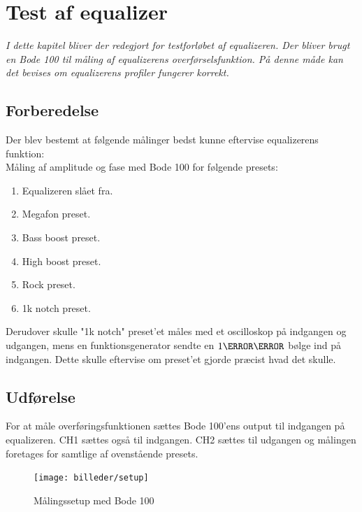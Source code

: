 \chapter{Test af equalizer}\label{sec:test_eq}

\emph{I dette kapitel bliver der redegjort for testforløbet af equalizeren. Der bliver brugt en Bode 100 til måling af equalizerens overførselsfunktion. På denne måde kan det bevises om equalizerens profiler fungerer korrekt.}

\section{Forberedelse}


Der blev bestemt at følgende målinger bedst kunne eftervise equalizerens funktion: \\

Måling af amplitude og fase med Bode 100 for følgende presets:
\begin{enumerate}
    \item Equalizeren slået fra.
    \item Megafon preset.
    \item Bass boost preset.
    \item High boost preset.
    \item Rock preset. 
    \item 1k notch preset. \\
\end{enumerate}
	


Derudover skulle "1k notch" preset'et måles med et oscilloskop på indgangen og udgangen, mens en funktionsgenerator sendte en $1\kilo\hertz$ bølge ind på indgangen. Dette skulle eftervise om preset'et gjorde præcist hvad det skulle. \\


\section{Udførelse}
For at måle overføringsfunktionen sættes Bode 100'ens output til indgangen på equalizeren. CH1 sættes også til indgangen. CH2 sættes til udgangen og målingen foretages for samtlige af ovenstående presets.


\begin{figure}[h!]
	\centering
	\texttt{[image: billeder/setup]}
	\caption{Målingssetup med Bode 100}
\end{figure}	


